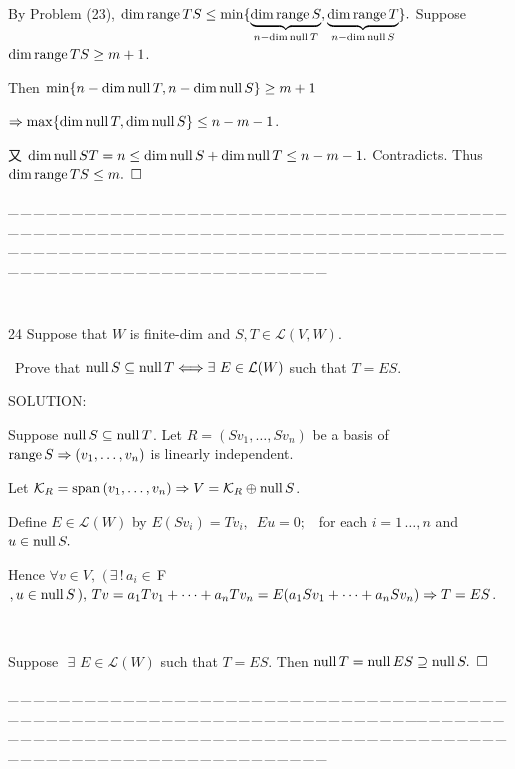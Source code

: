\documentclass[a4paper, 11pt, UTF8]{article}
\def\range{\textup{range}\,}
\def\null{\textup{null\,}}
\def\Spn{\textup{span}\,}
\def\Lm{\mathcal{L}}
\def\Fbfc{$\,{\timesbf F}$}
\begin{document}
\begin{large}
By Problem (23), $\dim\range TS\leq\min\{\underbrace{\dim \range S}_{n-\dim\null T}, \underbrace{\dim\range T}_{n-\dim\null S}\}.$ Suppose $\dim\range TS\geq m+1$.\par\quad
Then $\min\{n-\dim\null T,n-\dim\null S\}\geq m+1$\par\qquad
$\Rightarrow\max\{\dim\null T,\dim\null S\}\leq n-m-1$.\par\quad
又 $\dim\null ST=n\leq\dim\null S+\dim\null T\leq n-m-1.$ Contradicts. Thus $\dim\range TS\leq m.\,\,\,\square$\par
{\tiny \_\,\_\,\_\,\_\,\_\,\_\,\_\,\_\,\_\,\_\,\_\,\_\,\_\,\_\,\_\,\_\,\_\,\_\,\_\,\_\,\_\,\_\,\_\,\_\,\_\,\_\,\_\,\_\,\_\,\_\,\_\,\_\,\_\,\_\,\_\,\_\,\_\,\_\,\_\,\_\,\_\,\_\,\_\,\_\,\_\,\_\,\_\,\_\,\_\,\_\,\_\,\_\,\_\,\_\,\_\,\_\,\_\,\_\,\_\,\_\,\_\,\_\,\_\,\_\,\_\,\_\,\_\,\_\,\_\,\_\,\_\_\,\_\,\_\,\_\,\_\,\_\,\_\,\_\,\_\,\_\,\_\,\_\,\_\,\_\,\_\,\_\,\_\,\_\,\_\,\_\,\_\,\_\,\_\,\_\,\_\,\_\,\_\,\_\,\_\,\_\,\_\,\_\,\_\,\_\,\_\,\_\,\_\,\_\,\_\,\_\,\_\,\_\,\_\,\_\,\_\,\_\,\_\,\_\,\_\,\_\,\_\,\_\,\_\,\_\,\_\,\_\,\_\,\_\,\_\,\_\,\_\,\_\,\_\,\_\,\_\,\_\,\_\,\_\,\_\,\_\,\_}{\tiny\,\par}

{\timesbf\Large 24} {\timessl\Large 
Suppose that $W$ is finite-dim and $S, T\in\Lm(V, W)$.}\par\quad\,
{\timessl\Large Prove that $\null S\subseteq\null T\Longleftrightarrow\exists\,\,E\in\Lm(W)$ such that $T=ES$.
}\par
{\timesbf S\footnotesize{OLUTION:}}\par\quad
Suppose $\null S\subseteq\null T$. Let $R=(Sv_1,\dots,Sv_n)$ be a basis of $\range S\Rightarrow(v_1,\dots,v_n)$ is linearly independent.\par\quad
Let $\mathcal{K}_R=\Spn(v_1,\dots,v_n)\Rightarrow V=\mathcal{K}_R\oplus\null S$.\par\quad
Define $E\in\Lm(W)$ by $E(Sv_i)=Tv_i,\,\,\,Eu=0;$\,\,\, for each $i=1\,\dots,n$ and $u\in\null S.$\par\quad
Hence $\forall v\in V,\,\,(\,\exists\,!\,a_i\in\Fbfc,u\in\null S\,),\,Tv=a_1 Tv_1+\dots+a_n Tv_n=E(a_1 Sv_1+\dots+a_n Sv_n)\Rightarrow T=ES$.\par{\tiny{\,}\par}\quad
Suppose $\,\,\exists\,\,E\in\Lm(W)$ such that $T=ES$. Then $\null T=\null ES\supseteq\null S.\,\,\,\square$\par
{\tiny \_\,\_\,\_\,\_\,\_\,\_\,\_\,\_\,\_\,\_\,\_\,\_\,\_\,\_\,\_\,\_\,\_\,\_\,\_\,\_\,\_\,\_\,\_\,\_\,\_\,\_\,\_\,\_\,\_\,\_\,\_\,\_\,\_\,\_\,\_\,\_\,\_\,\_\,\_\,\_\,\_\,\_\,\_\,\_\,\_\,\_\,\_\,\_\,\_\,\_\,\_\,\_\,\_\,\_\,\_\,\_\,\_\,\_\,\_\,\_\,\_\,\_\,\_\,\_\,\_\,\_\,\_\,\_\,\_\,\_\,\_\_\,\_\,\_\,\_\,\_\,\_\,\_\,\_\,\_\,\_\,\_\,\_\,\_\,\_\,\_\,\_\,\_\,\_\,\_\,\_\,\_\,\_\,\_\,\_\,\_\,\_\,\_\,\_\,\_\,\_\,\_\,\_\,\_\,\_\,\_\,\_\,\_\,\_\,\_\,\_\,\_\,\_\,\_\,\_\,\_\,\_\,\_\,\_\,\_\,\_\,\_\,\_\,\_\,\_\,\_\,\_\,\_\,\_\,\_\,\_\,\_\,\_\,\_\,\_\,\_\,\_\,\_\,\_\,\_\,\_\,\_}{\tiny\,\par}


\end{large}
\end{document}
